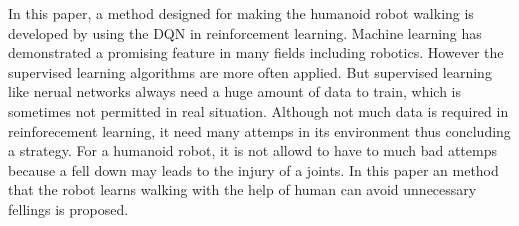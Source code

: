 In this paper, a method designed for making the humanoid robot walking is developed by using the DQN in reinforcement learning. Machine learning has demonstrated a promising feature in many fields including robotics. However the supervised learning algorithms are more often applied. But supervised learning like nerual networks always need a huge amount of data to train, which is sometimes not permitted in real situation. Although not much data is required in reinforecement learning, it need many attemps in its environment thus concluding a strategy. For a humanoid robot, it is not allowd to have to much bad attemps because a fell down may leads to the injury of a joints. In this paper an method that the robot learns walking with the help of human can avoid unnecessary fellings is proposed. 
\\\\
